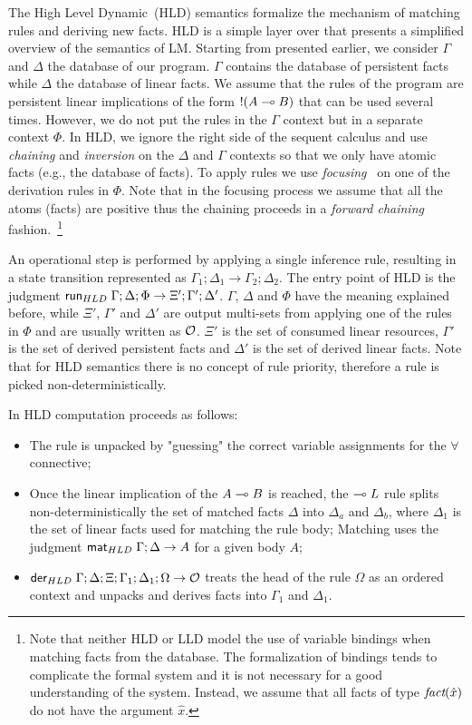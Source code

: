 The High Level Dynamic~(HLD) semantics formalize the mechanism of matching rules
and deriving new facts. HLD is a simple layer over \fragment that presents a
simplified overview of the semantics of LM.  Starting from \fragment presented
earlier, we consider $\Gamma$ and $\Delta$ the database of our program. $\Gamma$
contains the database of persistent facts while $\Delta$ the database of linear
facts. We assume that the rules of the program are persistent linear
implications of the form ${!} (A \multimap B)$ that can be used several times.
However, we do not put the rules in the $\Gamma$ context but in a separate
context $\Phi$. In HLD, we ignore the right side of the sequent calculus and use
\emph{chaining} and \emph{inversion} on the $\Delta$ and $\Gamma$ contexts so
that we only have atomic facts (e.g., the database of facts). To apply rules we
use \emph{focusing}~\cite{Andreoli92logicprogramming} on one of the derivation
rules in $\Phi$. Note that in the focusing process we assume that all the atoms
(facts) are positive thus the chaining proceeds in a \emph{forward chaining}
fashion.~\footnote{Note that neither HLD or LLD model the use of variable bindings when
matching facts from the database. The formalization of bindings tends to
complicate the formal system and it is not necessary for a good understanding of
the system. Instead, we assume that all facts of type $\emph{fact}(\hat{x})$ do
not have the argument $\hat{x}$.}

An operational step is performed by applying a single inference rule, resulting
in a state transition represented as $\Gamma_1; \Delta_1 \rightarrow \Gamma_2;
\Delta_2$. The entry point of HLD is the judgment $\mathsf{run}_{HLD} \; \Gamma; \Delta; \Phi
\rightarrow \Xi'; \Gamma'; \Delta'$.  $\Gamma$, $\Delta$ and $\Phi$ have the
meaning explained before, while $\Xi'$, $\Gamma'$ and $\Delta'$ are output
multi-sets from applying one of the rules in $\Phi$ and are usually written as
$\mathcal{O}$. $\Xi'$ is the set of consumed linear resources, $\Gamma'$ is the set
of derived persistent facts and $\Delta'$ is the set of derived linear facts.
Note that for HLD semantics there is no concept of rule priority, therefore a
rule is picked non-deterministically.

In HLD computation proceeds as follows:
\begin{itemize}[leftmargin=*]
   \item The rule is unpacked by "guessing" the correct variable assignments for
   the $\forall$ connective;
   \item Once the linear implication of the $A \multimap B$ is reached, the $\multimap
   L$ rule splits non-deterministically the set of matched facts $\Delta$ into
   $\Delta_a$ and $\Delta_b$, where $\Delta_1$ is the set of linear facts used
   for matching the rule body; Matching uses the judgment 
   $\mathsf{mat}_{HLD} \; \Gamma; \Delta \rightarrow A$ for a given body $A$;
   \item $\mathsf{der}_{HLD} \; \Gamma ; \Delta ; \Xi ; \Gamma_1 ; \Delta_1 ; \Omega \rightarrow
   \mathcal{O}$ treats the head of the rule $\Omega$ as an ordered context and
   unpacks and derives facts into $\Gamma_1$ and $\Delta_1$.
\end{itemize}

